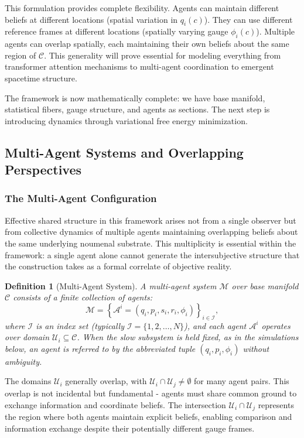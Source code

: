 \documentclass[11pt]{article}
\newtheorem{definition}{Definition}
\begin{document}
This formulation provides complete flexibility. Agents can maintain different beliefs at different locations (spatial variation in $q_i(c)$). They can use different reference frames at different locations (spatially varying gauge $\phi_i(c)$). Multiple agents can overlap spatially, each maintaining their own beliefs about the same region of $\mathcal{C}$. This generality will prove essential for modeling everything from transformer attention mechanisms to multi-agent coordination to emergent spacetime structure.

The framework is now mathematically complete: we have base manifold, statistical fibers, gauge structure, and agents as sections. The next step is introducing dynamics through variational free energy minimization.

\subsection{Multi-Agent Systems and Overlapping Perspectives}

\subsubsection{The Multi-Agent Configuration}

Effective shared structure in this framework arises not from a single observer but from collective dynamics of multiple agents maintaining overlapping beliefs about the same underlying noumenal substrate. This multiplicity is essential within the framework: a single agent alone cannot generate the intersubjective structure that the construction takes as a formal correlate of objective reality.

\begin{definition}[Multi-Agent System]
A multi-agent system $\mathcal{M}$ over base manifold $\mathcal{C}$ consists of a finite collection of agents:
\begin{equation}
\mathcal{M} = \left\{\mathcal{A}^i = (q_i, p_i, s_i, r_i, \phi_i)\right\}_{i \in \mathcal{I}},
\end{equation}
where $\mathcal{I}$ is an index set (typically $\mathcal{I} = \{1, 2, \ldots, N\}$), and each agent $\mathcal{A}^i$ operates over domain $\mathcal{U}_i \subseteq \mathcal{C}$. When the slow subsystem is held fixed, as in the simulations below, an agent is referred to by the abbreviated tuple $(q_i, p_i, \phi_i)$ without ambiguity.
\end{definition}

The domains $\mathcal{U}_i$ generally overlap, with $\mathcal{U}_i \cap \mathcal{U}_j \neq \emptyset$ for many agent pairs. This overlap is not incidental but fundamental - agents must share common ground to exchange information and coordinate beliefs. The intersection $\mathcal{U}_i \cap \mathcal{U}_j$ represents the region where both agents maintain explicit beliefs, enabling comparison and information exchange despite their potentially different gauge frames.
\end{document}
